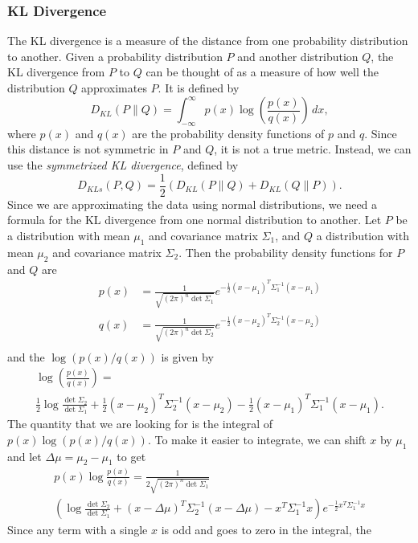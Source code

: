\documentclass{article}
\newcommand*{\Pn}[1]{\left( #1 \right)}
\begin{document}
\subsubsection{KL Divergence}

The KL divergence is a measure of the distance from one probability
distribution to another. Given a probability distribution $P$ and another
distribution $Q$, the KL divergence from $P$ to $Q$ can be thought of as a
measure of how well the distribution $Q$ approximates $P$. It is defined by
\[
    D_{KL}(P\| Q)=\int_{-\infty}^\infty p(x)\log\Pn{\frac{p(x)}{q(x)}}\,dx,
\]
where $p(x)$ and $q(x)$ are the probability density functions of $p$ and $q$.
Since this distance is not symmetric in $P$ and $Q$, it is not a true metric.
Instead, we can use the \emph{symmetrized KL divergence}, defined by
\[
    D_{KLs}(P,Q)=\frac12 (D_{KL}(P\| Q)+D_{KL}(Q\| P)).
\]
Since we are approximating the data using normal distributions, we need a
formula for the KL divergence from one normal distribution to another. Let $P$
be a distribution with mean $\mu_1$ and covariance matrix $\Sigma_1$, and $Q$ a
distribution with mean $\mu_2$ and covariance matrix $\Sigma_2$. Then the
probability density functions for $P$ and $Q$ are
\begin{align*}
    p(x) &= \frac{1}{\sqrt{(2\pi)^n\det\Sigma_1}}e^{-\frac12(x-\mu_1)^T \Sigma_1^{-1}(x-\mu_1)}\\
    q(x) &= \frac{1}{\sqrt{(2\pi)^n\det\Sigma_2}}e^{-\frac12(x-\mu_2)^T \Sigma_2^{-1}(x-\mu_2)}\\
\end{align*}
and the $\log(p(x)/q(x))$ is given by
\begin{multline*}
    \log\Pn{\frac{p(x)}{q(x)}}=\\ \frac12\log\frac{\det\Sigma_2}{\det\Sigma_1} +\frac12(x-\mu_2)^T\Sigma_2^{-1}(x-\mu_2)-\frac12(x-\mu_1)^T \Sigma_1^{-1}(x-\mu_1).
\end{multline*}
The quantity that we are looking for is the integral of $p(x)\log(p(x)/q(x))$.
To make it easier to integrate, we can shift $x$ by $\mu_1$ and let
$\Delta\mu=\mu_2-\mu_1$ to get
\begin{multline*}
    p(x)\log\frac{p(x)}{q(x)}=\frac{1}{2\sqrt{(2\pi)^n\det\Sigma_1}}\\
    \Pn{\log\frac{\det\Sigma_2}{\det\Sigma_1}+(x-\Delta\mu)^T\Sigma_2^{-1}(x-\Delta\mu)-x^T\Sigma_1^{-1}x}e^{-\frac12x^T\Sigma_1^{-1}x}
\end{multline*}
Since any term with a single $x$ is odd and goes to zero in the integral, the
\end{document}

